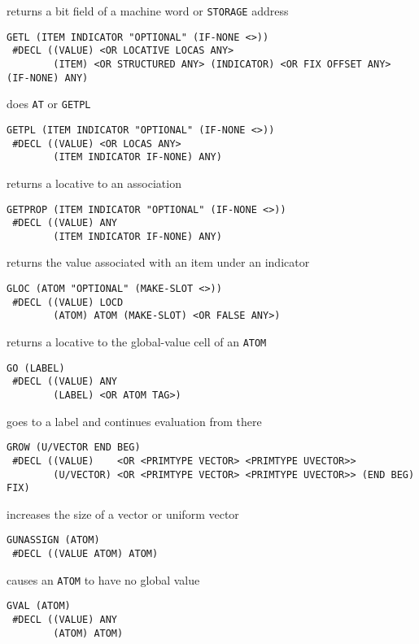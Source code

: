 \documentclass[a4paper]{scrbook}
\begin{document}
returns a bit field of a machine word or \texttt{STORAGE} address

\begin{verbatim}
GETL (ITEM INDICATOR "OPTIONAL" (IF-NONE <>))
 #DECL ((VALUE) <OR LOCATIVE LOCAS ANY>
        (ITEM) <OR STRUCTURED ANY> (INDICATOR) <OR FIX OFFSET ANY> (IF-NONE) ANY)
\end{verbatim}

does \texttt{AT} or \texttt{GETPL}

\begin{verbatim}
GETPL (ITEM INDICATOR "OPTIONAL" (IF-NONE <>))
 #DECL ((VALUE) <OR LOCAS ANY>
        (ITEM INDICATOR IF-NONE) ANY)
\end{verbatim}

returns a locative to an association

\begin{verbatim}
GETPROP (ITEM INDICATOR "OPTIONAL" (IF-NONE <>))
 #DECL ((VALUE) ANY
        (ITEM INDICATOR IF-NONE) ANY)
\end{verbatim}

returns the value associated with an item under an indicator

\begin{verbatim}
GLOC (ATOM "OPTIONAL" (MAKE-SLOT <>))
 #DECL ((VALUE) LOCD
        (ATOM) ATOM (MAKE-SLOT) <OR FALSE ANY>)
\end{verbatim}

returns a locative to the global-value cell of an \texttt{ATOM}

\begin{verbatim}
GO (LABEL)
 #DECL ((VALUE) ANY
        (LABEL) <OR ATOM TAG>)
\end{verbatim}

goes to a label and continues evaluation from there

\begin{verbatim}
GROW (U/VECTOR END BEG)
 #DECL ((VALUE)    <OR <PRIMTYPE VECTOR> <PRIMTYPE UVECTOR>>
        (U/VECTOR) <OR <PRIMTYPE VECTOR> <PRIMTYPE UVECTOR>> (END BEG) FIX)
\end{verbatim}

increases the size of a vector or uniform vector

\begin{verbatim}
GUNASSIGN (ATOM)
 #DECL ((VALUE ATOM) ATOM)
\end{verbatim}

causes an \texttt{ATOM} to have no global value

\begin{verbatim}
GVAL (ATOM)
 #DECL ((VALUE) ANY
        (ATOM) ATOM)
\end{verbatim}
\end{document}
